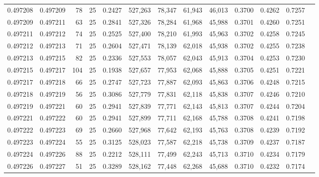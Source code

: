 \begin{tabular}{rrrrrrrrrrrrr}
0.497208 & 0.497209 &    78 &  25 &                                     0.2427 & 527,263 &  78,347 &  61,943 &  46,013 & 0.3700 & 0.4262 & 0.7257 \\
0.497209 & 0.497211 &    63 &  25 &                                     0.2841 & 527,326 &  78,284 &  61,968 &  45,988 & 0.3701 & 0.4260 & 0.7251 \\
0.497211 & 0.497212 &    74 &  25 &                                     0.2525 & 527,400 &  78,210 &  61,993 &  45,963 & 0.3702 & 0.4258 & 0.7245 \\
0.497212 & 0.497213 &    71 &  25 &                                     0.2604 & 527,471 &  78,139 &  62,018 &  45,938 & 0.3702 & 0.4255 & 0.7238 \\
0.497213 & 0.497215 &    82 &  25 &                                     0.2336 & 527,553 &  78,057 &  62,043 &  45,913 & 0.3704 & 0.4253 & 0.7230 \\
0.497215 & 0.497217 &   104 &  25 &                                     0.1938 & 527,657 &  77,953 &  62,068 &  45,888 & 0.3705 & 0.4251 & 0.7221 \\
0.497217 & 0.497218 &    66 &  25 &                                     0.2747 & 527,723 &  77,887 &  62,093 &  45,863 & 0.3706 & 0.4248 & 0.7215 \\
0.497218 & 0.497219 &    56 &  25 &                                     0.3086 & 527,779 &  77,831 &  62,118 &  45,838 & 0.3707 & 0.4246 & 0.7210 \\
0.497219 & 0.497221 &    60 &  25 &                                     0.2941 & 527,839 &  77,771 &  62,143 &  45,813 & 0.3707 & 0.4244 & 0.7204 \\
0.497221 & 0.497222 &    60 &  25 &                                     0.2941 & 527,899 &  77,711 &  62,168 &  45,788 & 0.3708 & 0.4241 & 0.7198 \\
0.497222 & 0.497223 &    69 &  25 &                                     0.2660 & 527,968 &  77,642 &  62,193 &  45,763 & 0.3708 & 0.4239 & 0.7192 \\
0.497223 & 0.497224 &    55 &  25 &                                     0.3125 & 528,023 &  77,587 &  62,218 &  45,738 & 0.3709 & 0.4237 & 0.7187 \\
0.497224 & 0.497226 &    88 &  25 &                                     0.2212 & 528,111 &  77,499 &  62,243 &  45,713 & 0.3710 & 0.4234 & 0.7179 \\
0.497226 & 0.497227 &    51 &  25 &                                     0.3289 & 528,162 &  77,448 &  62,268 &  45,688 & 0.3710 & 0.4232 & 0.7174 \\

\end{tabular}
